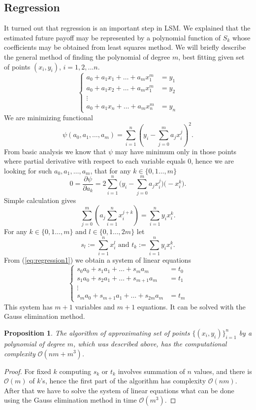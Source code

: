 \documentclass[a4paper,11pt, twoside]{book}
\newtheorem{prop}[thm]{Proposition}
\theoremstyle{definition}
\theoremstyle{remark}
\begin{document}
\subsection{Regression}
It turned out that regression is an important step in LSM. We explained that the estimated future payoff may be represented by a polynomial function of $S_k$ whose coefficients may be obtained from least squares method. We will briefly describe the general method of finding the polynomial of degree $m$, best fitting given set of points $(x_i, y_i)$, $i=1,2,...n$.
\[ \begin{cases}
    a_0 + a_1 x_1 + \ldots + a_m x_1^m &= y_1 \\
    a_0 + a_1 x_2 + \ldots + a_m x_1^m &= y_2 \\
    \vdots & \\
    a_0 + a_1 x_n + \ldots + a_m x_n^m &= y_n
   \end{cases}
\]
We are minimizing functional
\[ \psi(a_0,a_1,\ldots,a_m) = \sum\limits_{i=1}^n \left( y_i - \sum\limits_{j=0}^m a_jx_i^j \right)^2. \]
From basic analysis we know that $\psi$ may have minimum only in those points where partial derivative with respect to each variable equals 0, hence we are looking for such $a_0,a_1,\ldots,a_m$, that for any $k \in \{0,1\ldots,m\}$
\[ 0 = \frac{\partial \psi}{\partial a_k} = 2  \sum\limits_{i=1}^n \bigl( y_i - \sum\limits_{j=0}^m a_jx_i^j \bigr) \bigl( -x_i^k \bigr). \]
Simple calculation gives
\begin{equation}
 \label{eq:regression1}
 \sum\limits_{j=0}^m \left( a_j \sum\limits_{i=1}^n  x_i^{j+k} \right) = \sum\limits_{i=1}^n y_i x_i^k. 
\end{equation}
For any $k \in \{0,1\ldots,m\}$ and $l \in \{0,1\ldots,2m\}$ let
\[ s_{l} := \sum\limits_{i=1}^n  x_i^l \text{\ \ \ and \ \ } t_k := \sum\limits_{i=1}^n y_i x_i^k .\]
From (\ref{eq:regression1}) we obtain a system of linear equations
\begin{equation}
 \label{eq:regression2}
 \begin{cases}
  s_0 a_0 + s_1 a_1 + \ldots + s_m a_m &= t_0 \\
  s_1 a_0 + s_2 a_1 + \ldots + s_{m+1} a_m &= t_1 \\
    \vdots & \\
  s_m a_0 + s_{m+1} a_1 + \ldots + s_{2m} a_m &= t_m
  \end{cases}
\end{equation}
This system has $m+1$ variables and $m+1$ equations. It can be solved with the Gauss elimination method.
\begin{prop}
 The algorithm of approximating set of points $\{ (x_i,y_i) \}_{i=1}^n$ by a polynomial of degree $m$, which was described above, has the computational complexity \mbox{$\mathcal{O}(nm + m^3)$}.
\end{prop}
\begin{proof}
 For fixed $k$ computing $s_k$ or $t_k$ involves summation of $n$ values, and there is $\mathcal{O}(m)$ of $k$'s, hence the first part of the algorithm  has complexity $\mathcal{O}(nm)$. After that we have to solve the system of linear equations what can be done using the Gauss elimination method in time $\mathcal{O}(m^3)$.
\end{proof}
\end{document}

